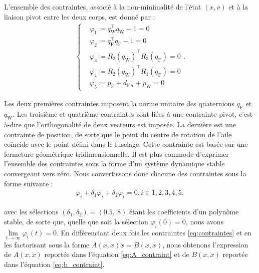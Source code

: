 L'ensemble des contraintes, associé à la non-minimalité de l'état $(x,v)$ et à la liaison pivot entre les deux corps, est donné par :
\begin{align}
    \label{eq:contraintes}
    \left\{
    \begin{aligned}
    &\varphi_{1} \coloneqq q_{\text{W}}^\top q_{\text{W}} - 1 = 0\\
    &\varphi_{2} \coloneqq q_{\text{F}}^\top q_{\text{F}} - 1 = 0\\
    &\varphi_{3} \coloneqq R_{2}(q_{\text{W}})^\top R_{3}(q_{\text{F}}) = 0\\
    &\varphi_{4} \coloneqq R_{2}(q_{\text{W}})^\top R_{1}(q_{\text{F}}) = 0\\
    &\varphi_{5} \coloneqq p_{\text{F}} + d_{\text{FA}} + p_{\text{W}} = 0
    \end{aligned}.
    \right.
\end{align}

Les deux premières contraintes imposent la norme unitaire des quaternions $q_{\text{F}}$ et $q_{\text{W}}$.
Les troisième et quatrième contraintes sont liées à une contrainte pivot, c'est-à-dire que l'orthogonalité de deux vecteurs est imposée. La dernière est une contrainte de position, de sorte que le point du centre de rotation de l'aile coïncide avec le point défini dans le fuselage. Cette contrainte est basée sur une fermeture géométrique tridimensionnelle.
Il est plus commode d'exprimer l'ensemble des contraintes sous la forme d'un système dynamique stable convergeant vers zéro. Nous convertissons donc chacune des contraintes sous la forme suivante :
\begin{align}
    \ddot{\varphi_{i}} + \delta_{1} \dot{\varphi_{i}}  + \delta_{2} \varphi_{i} = 0, i \in {1,2,3,4,5},
\end{align}

avec les sélections $(\delta_{1}, \delta_{2}) = (0.5,~8)$ étant les coefficients d'un polynôme stable, de sorte que, quelle que soit la sélection $\varphi_{i}(0) = 0$, nous avons $\lim\limits_{t \to \infty} \varphi_{i}(t) = 0$. En différenciant deux fois les contraintes \eqref{eq:contraintes} et en les factorisant sous la forme $ A(x,\dot{x}) \ddot{x} = B(x,\dot{x})$, nous obtenons l'expression de $A(x,\dot{x})$ reportée dans l'équation \eqref{eq:A_contraint} et de $B(x,\dot{x})$ reportée dans l'équation \eqref{eq:b_contraint}.


